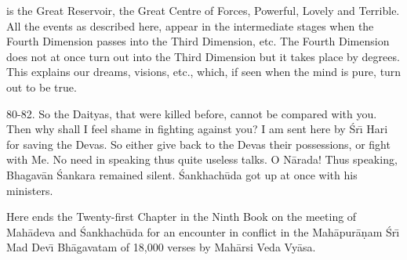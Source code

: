 is the Great Reservoir, the Great Centre of Forces, Powerful, Lovely and Terrible. All the events as described here, appear in the intermediate stages when the Fourth Dimension passes into the Third Dimension, etc. The Fourth Dimension does not at once turn out into the Third Dimension but it takes place by degrees. This explains our dreams, visions, etc., which, if seen when the mind is pure, turn out to be true.

80-82. So the Daityas, that were killed before, cannot be compared with you. Then why shall I feel shame in fighting against you? I am sent here by \'Sr\={\i} Hari for saving the Devas. So either give back to the Devas their possessions, or fight with Me. No need in speaking thus quite useless talks. O N\=arada! Thus speaking, Bhagav\=an \'Sankara remained silent. \'Sankhach\=uda got up at once with his ministers.

Here ends the Twenty-first Chapter in the Ninth Book on the meeting of Mah\=adeva and \'Sankhach\=uda for an encounter in conflict in the Mah\=apur\=a\d{n}am \'Sr\={\i} Mad Dev\={\i} Bh\=agavatam of 18,000 verses by Mah\=arsi Veda Vy\=asa.



